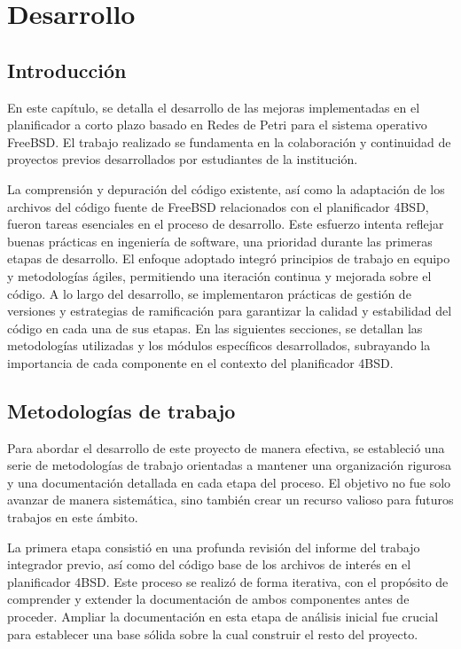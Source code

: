 \chapter{Desarrollo}

\section{Introducción}
En este capítulo, se detalla el desarrollo de las mejoras implementadas en el planificador a corto plazo basado en Redes de Petri para el sistema operativo FreeBSD. El trabajo realizado se fundamenta en la colaboración y continuidad de proyectos previos desarrollados por estudiantes de la institución.\par

La comprensión y depuración del código existente, así como la adaptación de los archivos del código fuente de FreeBSD relacionados con el planificador 4BSD, fueron tareas esenciales en el proceso de desarrollo. Este esfuerzo intenta reflejar buenas prácticas en ingeniería de software, una prioridad durante las primeras etapas de desarrollo. El enfoque adoptado integró principios de trabajo en equipo y metodologías ágiles, permitiendo una iteración continua y mejorada sobre el código. A lo largo del desarrollo, se implementaron prácticas de gestión de versiones y estrategias de ramificación para garantizar la calidad y estabilidad del código en cada una de sus etapas. En las siguientes secciones, se detallan las metodologías utilizadas y los módulos específicos desarrollados, subrayando la importancia de cada componente en el contexto del planificador 4BSD.\par


\section{Metodologías de trabajo}
Para abordar el desarrollo de este proyecto de manera efectiva, se estableció una serie de metodologías de trabajo orientadas a mantener una organización rigurosa y una documentación detallada en cada etapa del proceso. El objetivo no fue solo avanzar de manera sistemática, sino también crear un recurso valioso para futuros trabajos en este ámbito.\par

La primera etapa consistió en una profunda revisión del informe del trabajo integrador previo, así como del código base de los archivos de interés en el planificador 4BSD. Este proceso se realizó de forma iterativa, con el propósito de comprender y extender la documentación de ambos componentes antes de proceder. Ampliar la documentación en esta etapa de análisis inicial fue crucial para establecer una base sólida sobre la cual construir el resto del proyecto.\par

